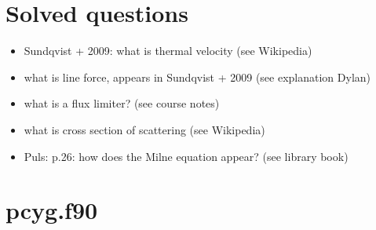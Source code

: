 \documentclass[../main/main.tex]{subfiles}
\begin{document}
\section{Solved questions}
\begin{itemize}
\item Sundqvist + 2009: what is thermal velocity (see Wikipedia)
\item what is line force, appears in Sundqvist + 2009 (see explanation Dylan)
\item what is a flux limiter? (see course notes)
\item what is cross section of scattering (see Wikipedia)
\item Puls: p.26: how does the Milne equation appear? (see library book)
\end{itemize}

\newpage
\section{pcyg.f90}
\end{document}
